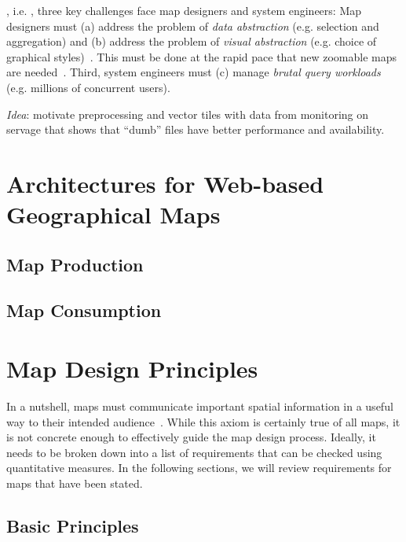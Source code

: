 \documentclass[11pt, oneside]{report}   	%
\begin{document}

, i.e. , three key challenges face map designers and system engineers: Map designers must (a) address the problem of \emph{data abstraction} (e.g. selection and aggregation) and (b) address the problem of  \emph{visual abstraction} (e.g. choice of graphical styles)~\cite{stolte2003multiscale}. This must be done at the rapid pace that new zoomable maps are needed~\cite{lomet2012warstories}. Third, system engineers must (c) manage \emph{brutal query workloads} (e.g. millions of concurrent users).

\emph{Idea}: motivate preprocessing and vector tiles with data from monitoring on servage that shows that ``dumb'' files have better performance and availability.

\section{Architectures for Web-based Geographical Maps}

\subsection{Map Production}

\subsection{Map Consumption}

\section{Map Design Principles}
In a nutshell, maps must communicate important spatial information in a useful way to their intended audience~\cite{robinson1982early}. While this axiom is certainly true of all maps, it is not concrete enough to effectively guide the map design process. Ideally, it needs to be broken down into a list of requirements that can be checked using quantitative measures. In the following sections, we will review requirements for maps that have been stated.

\subsection{Basic Principles}
\end{document}
